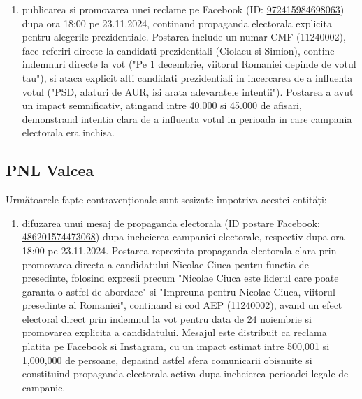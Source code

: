 \documentclass[a4paper,12pt]{article}
\begin{document}
\begin{enumerate}[leftmargin=*, label=\arabic*.)]
    \item publicarea si promovarea unei reclame pe Facebook (ID: \href{https://www.facebook.com/ads/library/?id=972415984698063}{972415984698063}) dupa ora 18:00 pe 23.11.2024, continand propaganda electorala explicita pentru alegerile prezidentiale. Postarea include un numar CMF (11240002), face referiri directe la candidati prezidentiali (Ciolacu si Simion), contine indemnuri directe la vot ("Pe 1 decembrie, viitorul Romaniei depinde de votul tau"), si ataca explicit alti candidati prezidentiali in incercarea de a influenta votul ("PSD, alaturi de AUR, isi arata adevaratele intentii"). Postarea a avut un impact semnificativ, atingand intre 40.000 si 45.000 de afisari, demonstrand intentia clara de a influenta votul in perioada in care campania electorala era inchisa.
\end{enumerate}

\vspace{0.5cm}

\subsection{PNL Valcea}
Următoarele fapte contravenționale sunt sesizate împotriva acestei entități:

\begin{enumerate}[leftmargin=*, label=\arabic*.)]
    \item difuzarea unui mesaj de propaganda electorala (ID postare Facebook: \href{https://www.facebook.com/ads/library/?id=486201574473068}{486201574473068}) dupa incheierea campaniei electorale, respectiv dupa ora 18:00 pe 23.11.2024. Postarea reprezinta propaganda electorala clara prin promovarea directa a candidatului Nicolae Ciuca pentru functia de presedinte, folosind expresii precum "Nicolae Ciuca este liderul care poate garanta o astfel de abordare" si "Impreuna pentru Nicolae Ciuca, viitorul presedinte al Romaniei", continand si cod AEP (11240002), avand un efect electoral direct prin indemnul la vot pentru data de 24 noiembrie si promovarea explicita a candidatului. Mesajul este distribuit ca reclama platita pe Facebook si Instagram, cu un impact estimat intre 500,001 si 1,000,000 de persoane, depasind astfel sfera comunicarii obisnuite si constituind propaganda electorala activa dupa incheierea perioadei legale de campanie.
\end{enumerate}

\vspace{0.5cm}
\end{document}
